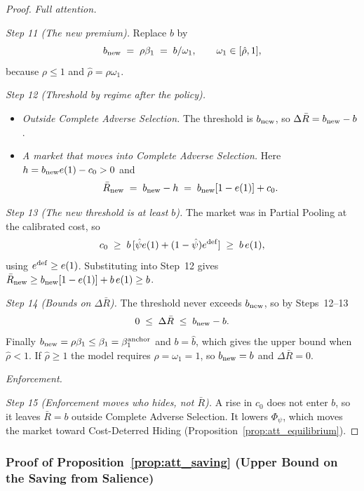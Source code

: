 \begin{proof}
\medskip\noindent\emph{Full attention.}

\emph{Step 11 (The new premium).} Replace $b$ by
\begin{equation*}
    b_{\rm new}\;=\;\rho\beta_1\;=\;b/\omega_1,\qquad \omega_1\in[\hat\rho,1],
\end{equation*}
because $\rho\le1$ and $\hat\rho=\rho\omega_1$.

\emph{Step 12 (Threshold by regime after the policy).}
\begin{itemize}
    \item \emph{Outside Complete Adverse Selection.} The threshold is $b_{\rm new}$, so $\Delta\bar R=b_{\rm new}-b$.
    \item \emph{A market that moves into Complete Adverse Selection.} Here $h=b_{\rm new}e(1)-c_0>0$ and
    \begin{equation*}
        \bar R_{\rm new}\;=\;b_{\rm new}-h\;=\;b_{\rm new}[1-e(1)]+c_0.
    \end{equation*}
\end{itemize}

\emph{Step 13 (The new threshold is at least $b$).} The market was in Partial Pooling at the calibrated cost, so
\begin{equation*}
    c_0\;\ge\;b\,[\hat\psi e(1)+(1-\hat\psi)e^{\rm def}]\;\ge\;b\,e(1),
\end{equation*}
using $e^{\rm def}\ge e(1)$. Substituting into Step~12 gives $\bar R_{\rm new}\ge b_{\rm new}[1-e(1)]+b\,e(1)\ge b$.

\emph{Step 14 (Bounds on $\Delta\bar R$).} The threshold never exceeds $b_{\rm new}$, so by Steps~12--13
\begin{equation*}
    0\;\le\;\Delta\bar R\;\le\;b_{\rm new}-b.
\end{equation*}
Finally $b_{\rm new}=\rho\beta_1\le\beta_1=\beta_1^{\rm anchor}$ and $b=\hat b$, which gives the upper bound when $\hat\rho<1$. If $\hat\rho\ge1$ the model requires $\rho=\omega_1=1$, so $b_{\rm new}=b$ and $\Delta\bar R=0$.

\medskip\noindent\emph{Enforcement.}

\emph{Step 15 (Enforcement moves who hides, not $\bar R$).} A rise in $c_0$ does not enter $b$, so it leaves $\bar R=b$ outside Complete Adverse Selection. It lowers $\Phi_\psi$, which moves the market toward Cost-Deterred Hiding (Proposition~\ref{prop:att_equilibrium}).
\end{proof}

\subsubsection*{Proof of Proposition~\ref{prop:att_saving} (Upper Bound on the Saving from Salience)}

